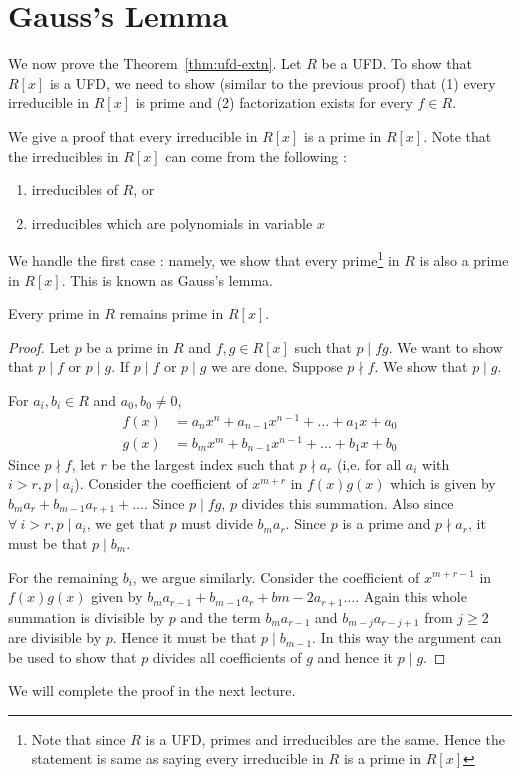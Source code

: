 \section{Gauss's Lemma}
We now prove the Theorem~\ref{thm:ufd-extn}. Let $R$ be a UFD. 
To show that $R[x]$ is a UFD, we need to show (similar to the previous proof)
that (1) every irreducible in $R[x]$ is prime and (2) factorization exists for
every $f \in R$.

We give a proof that every irreducible in $R[x]$ is a prime in $R[x]$.
Note that the irreducibles in $R[x]$ can come from the following :
\begin{enumerate}
	\item irreducibles of $R$, or
	\item irreducibles which are polynomials in variable $x$
\end{enumerate}
We handle the first case : namely, we show that every prime\footnote{Note that
since $R$ is a UFD, primes and irreducibles are the same. Hence the statement
is same as saying every irreducible in $R$ is a prime in $R[x]$} in $R$ is
also a prime in $R[x]$. This is known as Gauss's lemma.

\begin{lemma}\label{lem:gauss}
	Every prime in $R$ remains prime in $R[x]$.
\end{lemma}
\begin{proof}
	Let $p$ be a prime in $R$ and $f,g \in R[x]$ such that $p \mid fg$. We
	want to show that $p \mid f$ or $p \mid g$. If $p \mid f$ or $p \mid
	g$ we are done. Suppose $p \nmid f$. We show that $p \mid g$.

	For $a_i, b_i \in R$ and $a_0, b_0 \ne 0$,
	\begin{align*}
		f(x) & = a_nx^n + a_{n-1}x^{n-1} + \ldots + a_1x + a_0 \\
		g(x) & = b_mx^m + b_{n-1}x^{n-1} + \ldots + b_1x + b_0 
	\end{align*}
	Since $p \nmid f$, let $r$ be the largest index such that $p \nmid
	a_r$ (i,e. for all $a_i$ with $i > r, p \mid a_i$). Consider the
	coefficient of $x^{m+r}$ in $f(x)g(x)$ which is given by $b_ma_r +
	b_{m-1}a_{r+1} + \ldots$. Since $p \mid fg$, $p$ divides this
	summation. Also since $\forall~i > r, p \mid a_i$, we get that $p$
	must divide $b_ma_r$. Since $p$ is a prime and $p \nmid a_r$, it must
	be that $p \mid b_m$. 
	
	For the remaining $b_i$, we argue similarly. Consider the coefficient
	of $x^{m+r-1}$ in $f(x)g(x)$ given by $b_ma_{r-1} + b_{m-1}a_r +
	b{m-2}a_{r+1} \ldots$. Again this whole summation is divisible by $p$
	and the term $b_ma_{r-1}$ and $b_{m-j}a_{r-j+1}$ from $j \ge 2$ are
	divisible by $p$. Hence it must be that $p \mid b_{m-1}$. In this way
	the argument can be used to show that $p$ divides all coefficients of
	$g$ and hence it $p \mid g$.
\end{proof}
We will complete the proof in the next lecture.

